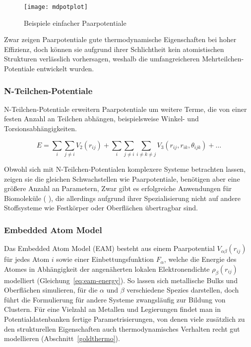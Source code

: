 \begin{figure}
  \centering
  \texttt{[image: mdpotplot]}
  \caption{Beispiele einfacher Paarpotentiale}
  \label{fig:mdpairpotentials}
\end{figure}

Zwar zeigen Paarpotentiale gute thermodynamische Eigenschaften bei hoher Effizienz, doch können sie aufgrund ihrer Schlichtheit kein atomistischen Strukturen verlässlich vorhersagen, weshalb die umfangreicheren Mehrteilchen-Potentiale entwickelt wurden.

\subsubsection{N-Teilchen-Potentiale}

N-Teilchen-Potentiale erweitern Paarpotentiale um weitere Terme, die von einer festen Anzahl an Teilchen abhängen, beispielsweise Winkel- und Torsionsabhängigkeiten.

\begin{equation}
  \label{eq:nbody-energy}
  E = \sum_i\sum_{j \neq i}{V_2\left(r_{ij}\right)} + \sum_i\sum_{j \neq i}\sum_{i \neq k \neq j}{V_3\left(r_{ij}, r_{ik}, \theta_{ijk}\right)} + \dots
\end{equation}

Obwohl sich mit N-Teilchen-Potentialen komplexere Systeme betrachten lassen, zeigen sie die gleichen Schwachstellen wie Paarpotentiale, benötigen aber eine größere Anzahl an Parametern,
Zwar gibt es erfolgreiche  Anwendungen für Biomoleküle (  ), die allerdings aufgrund ihrer Spezialisierung nicht auf andere Stoffsysteme wie Festkörper oder Oberflächen übertragbar sind.

\subsubsection{Embedded Atom Model}

Das Embedded Atom Model (EAM) besteht aus einem Paarpotential $V_{\alpha\beta}(r_{ij})$ für jedes Atom $i$ sowie einer Einbettungsfunktion $F_\alpha$, welche die Energie des Atomes in Abhängigkeit der angenäherten lokalen Elektronendichte $\rho_\beta(r_{ij})$ modelliert (Gleichung~\ref{eq:eam-energy})\cite{daw_embedded-atom_1984}.
So lassen sich metallische Bulks und Oberflächen simulieren, für die $\alpha$ und $\beta$ verschiedene Spezies darstellen, doch führt die Formulierung für andere Systeme zwangsläufig zur Bildung von Clustern.
Für eine Vielzahl an Metallen und Legierungen findet man in Potentialdatenbanken fertige Parametrisierungen, von denen viele zusätzlich zu den strukturellen Eigenschaften auch thermodynamisches Verhalten recht gut modellieren (Abschnitt~\ref{goldthermo}).

